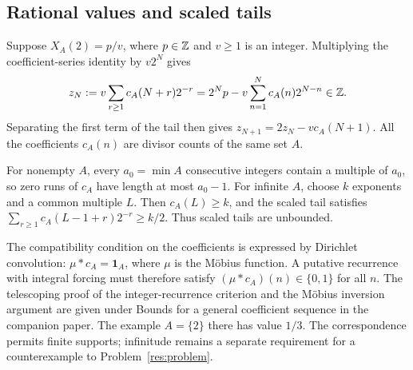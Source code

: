 \documentclass[11pt]{article}
\begin{document}
\subsection{Rational values and scaled tails}\label{sec:forced}
Suppose $X_A(2)=p/v$, where $p\in\mathbb{Z}$ and $v\ge1$ is an integer.
Multiplying the coefficient-series identity by $v2^N$ gives
\[
 z_N:=v\sum_{r\ge1}c_A(N+r)2^{-r}
     =2^Np-v\sum_{n=1}^{N}c_A(n)2^{N-n}\in\mathbb{Z}.
\]
Separating the first term of the tail then gives
$z_{N+1}=2z_N-vc_A(N+1)$.
All the coefficients $c_A(n)$ are divisor counts of the same set $A$.

For nonempty $A$, every $a_0=\min A$ consecutive integers contain
a multiple of $a_0$, so zero runs of $c_A$ have length at most $a_0-1$.
For infinite $A$, choose $k$ exponents and a common multiple $L$.
Then $c_A(L)\ge k$, and the scaled tail satisfies
$\sum_{r\ge1}c_A(L-1+r)2^{-r}\ge k/2$. Thus scaled tails are
unbounded.

The compatibility condition on the coefficients is expressed by
Dirichlet convolution:
$\mu*c_A=\mathbf1_A$, where $\mu$ is the M\"obius function.
A putative recurrence with integral forcing must therefore satisfy
$(\mu*c_A)(n)\in\{0,1\}$ for all $n$.
The telescoping proof of the integer-recurrence criterion and the
M\"obius inversion argument are given under
{Bounds for a general coefficient sequence} in the companion paper.  The example $A=\{2\}$ there has value $1/3$.
The correspondence permits finite supports; infinitude remains a separate
requirement for a counterexample to Problem~\ref{res:problem}.
\end{document}
